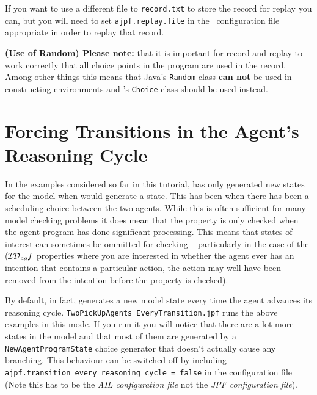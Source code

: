 If you want to use a different file to \texttt{record.txt} to store the record for replay you can, but you will need to set \texttt{ajpf.replay.file} in the \ail\ configuration file appropriate in order to replay that record.

{\bf (Use of Random) Please note:} that it is important for record and replay to work correctly that all choice points in the program are used in the record.  Among other things this means that Java's \texttt{Random} class {\bf can not} be used in constructing environments and \ajpf's \texttt{Choice} class should be used instead.  

\section{Forcing Transitions in the Agent's Reasoning Cycle}
In the examples considered so far in this tutorial, \ajpf{} has only generated new states for the model when \jpf{} would generate a state.  This has been when there has been a scheduling choice between the two agents.  While this is often sufficient for many model checking problems it does mean that the property is only checked when the agent program has done significant processing.  This means that states of interest can sometimes be ommitted for checking -- particularly in the case of the ($\mathrm{{\cal ID}}_{\mathit{ag}} f$\index{$\lintendtodofunc$} properties where you are interested in whether the agent ever has an intention that contains a particular action, the action may well have been removed from the intention before the property is checked).

\begin{sloppypar}
By default, in fact, \ajpf{} generates a new model state every time the agent advances its reasoning cycle.  \texttt{TwoPickUpAgents\_EveryTransition.jpf} runs the above examples in this mode.  If you run it you will notice that there are a lot more states in the model and that most of them are generated by a \texttt{NewAgentProgramState} choice generator that doesn't actually cause any branching.  This behaviour can be switched off by including \texttt{ajpf.transition\_every\_reasoning\_cycle = false} in the \ail{} configuration file (Note this has to be the \emph{AIL configuration file} not the \emph{JPF configuration file}).
\end{sloppypar}


